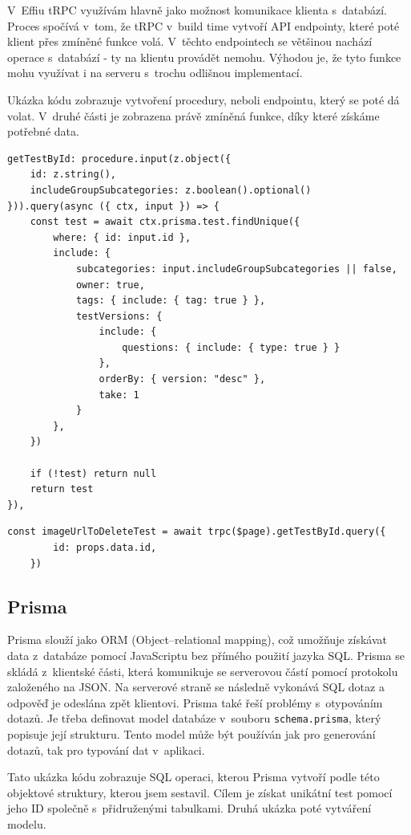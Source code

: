 \documentclass[12pt, a4paper,
openright
]{report}
\begin{document}
V~Effiu tRPC využívám hlavně jako možnost komunikace klienta s~databází. Proces spočívá v~tom, že tRPC v~build time vytvoří API endpointy, které poté klient přes zmíněné funkce volá. V~těchto endpointech se většinou nachází operace s~databází - ty na klientu provádět nemohu. Výhodou je, že tyto funkce mohu využívat i na serveru s~trochu odlišnou implementací.

Ukázka kódu zobrazuje vytvoření procedury, neboli endpointu, který se poté dá volat. V~druhé části je zobrazena právě zmíněná funkce, díky které získáme potřebné data.

\begin{lstlisting}[style=ES6, caption=Endpoint generovaný pomocí tRPC, label=trpc_code]
getTestById: procedure.input(z.object({
	id: z.string(),
	includeGroupSubcategories: z.boolean().optional()
})).query(async ({ ctx, input }) => {
	const test = await ctx.prisma.test.findUnique({
		where: { id: input.id },
		include: {
			subcategories: input.includeGroupSubcategories || false,
			owner: true,
			tags: {	include: { tag: true } },
			testVersions: {
				include: {
					questions: { include: { type: true } }
				},
				orderBy: { version: "desc" },
				take: 1
			}
		},
	})
	
	if (!test) return null
	return test
}),
\end{lstlisting}
\begin{lstlisting}[style=ES6, caption=Volání funkce pomocí tRPC klienta s~metodou getTestById, label=trpc_code_use]
	const imageUrlToDeleteTest = await trpc($page).getTestById.query({
		id: props.data.id,
	})
\end{lstlisting}
\subsection{Prisma}
Prisma slouží jako ORM (Object–relational mapping), což umožňuje získávat data z~databáze pomocí JavaScriptu bez přímého použití jazyka SQL. Prisma se skládá z~klientské části, která komunikuje se serverovou částí pomocí protokolu založeného na JSON. Na serverové straně se následně vykonává SQL dotaz a odpověď je odeslána zpět klientovi. Prisma také řeší problémy s~otypováním dotazů. Je třeba definovat model databáze v~souboru \texttt{schema.prisma}, který popisuje její strukturu. Tento model může být používán jak pro generování dotazů, tak pro typování dat v~aplikaci.

Tato ukázka kódu zobrazuje SQL operaci, kterou Prisma vytvoří podle této objektové struktury, kterou jsem sestavil. Cílem je získat unikátní test pomocí jeho ID společně s~přidruženými tabulkami. Druhá ukázka poté vytváření modelu.
\end{document}
